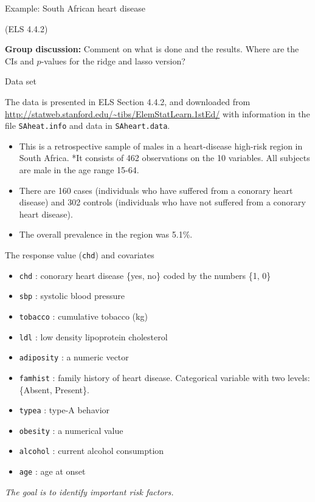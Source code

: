 \documentclass[
  ignorenonframetext,
]{beamer}
\providecommand{\tightlist}{%
  \setlength{\itemsep}{0pt}\setlength{\parskip}{0pt}}
\begin{document}
\begin{frame}{Example: South African heart disease}
\protect\hypertarget{example-south-african-heart-disease}{}

(ELS 4.4.2)

\textbf{Group discussion:} Comment on what is done and the results.
Where are the CIs and \(p\)-values for the ridge and lasso version?

\end{frame}

\begin{frame}[fragile]

\begin{block}{Data set}

The data is presented in ELS Section 4.4.2, and downloaded from
\url{http://statweb.stanford.edu/~tibs/ElemStatLearn.1stEd/} with
information in the file \texttt{SAheat.info} and data in
\texttt{SAheart.data}.

\begin{itemize}
\tightlist
\item
  This is a retrospective sample of males in a heart-disease high-risk
  region in South Africa. *It consists of 462 observations on the 10
  variables. All subjects are male in the age range 15-64.
\item
  There are 160 cases (individuals who have suffered from a conorary
  heart disease) and 302 controls (individuals who have not suffered
  from a conorary heart disease).\\
\item
  The overall prevalence in the region was 5.1\%.
\end{itemize}

The response value (\texttt{chd}) and covariates

\begin{itemize}
\tightlist
\item
  \texttt{chd} : conorary heart disease \{yes, no\} coded by the numbers
  \{1, 0\}
\item
  \texttt{sbp} : systolic blood pressure\\
\item
  \texttt{tobacco} : cumulative tobacco (kg)\\
\item
  \texttt{ldl} : low density lipoprotein cholesterol
\item
  \texttt{adiposity} : a numeric vector
\item
  \texttt{famhist} : family history of heart disease. Categorical
  variable with two levels: \{Absent, Present\}.
\item
  \texttt{typea} : type-A behavior
\item
  \texttt{obesity} : a numerical value
\item
  \texttt{alcohol} : current alcohol consumption
\item
  \texttt{age} : age at onset
\end{itemize}

\emph{The goal is to identify important risk factors.}

\end{block}

\end{frame}
\end{document}

